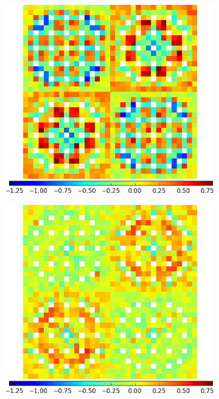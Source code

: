 \begin{figure}[h!]
\begin{subfigure}{0.45\textwidth}
  \caption{}
  \label{fig:chap11-assm-2x2-capt-lns}
\end{subfigure}%
\begin{subfigure}{0.45\textwidth}
  \centering
  \includegraphics[width=\linewidth]{figures/results/2x2/ensemble-transform/capt-err-pinch-agglomerative-(2)}
  \caption{}
  \label{fig:chap11-assm-2x2-capt-pinch-2}
\end{subfigure}
\begin{subfigure}{0.45\textwidth}
  \centering
  \includegraphics[width=\linewidth]{figures/results/2x2/ensemble-transform/capt-err-pinch-agglomerative-(6)}

\end{subfigure}
\end{figure}
